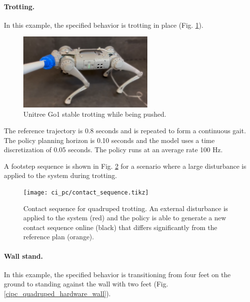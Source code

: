 \paragraph{Trotting.}
In this example, the specified behavior is trotting in place (Fig. \ref{cipc_quadruped_hardware_trot}). 

\begin{figure}[H]
	\centering
	\includegraphics[height=3.85cm]{ci_pc/cipc_quadruped_trot_push_blur.png}
	\caption[Unitree Go1 stable trotting while being pushed]{Unitree Go1 stable trotting while being pushed.}
	\label{cipc_quadruped_hardware_trot}
\end{figure}
The reference trajectory is 0.8 seconds and is repeated to form a continuous gait. The policy planning horizon is 0.10 seconds and the model uses a time discretization of 0.05 seconds. The policy runs at an average rate 100 Hz. 

A footstep sequence is shown in Fig. \ref{contact_sequence} for a scenario where a large disturbance is applied to the system during trotting.

\begin{figure}[H]
	\centering
	\texttt{[image: ci\_pc/contact\_sequence.tikz]}		\caption{Contact sequence for quadruped trotting. An external disturbance is applied to the system (red) and the policy is able to generate a new contact sequence online (black) that differs significantly from the reference plan (orange).}
	\label{contact_sequence}
\end{figure}

\paragraph{Wall stand.}
In this example, the specified behavior is transitioning from four feet on the ground to standing against the wall with two feet (Fig. \ref{cipc_quadruped_hardware_wall}). 

